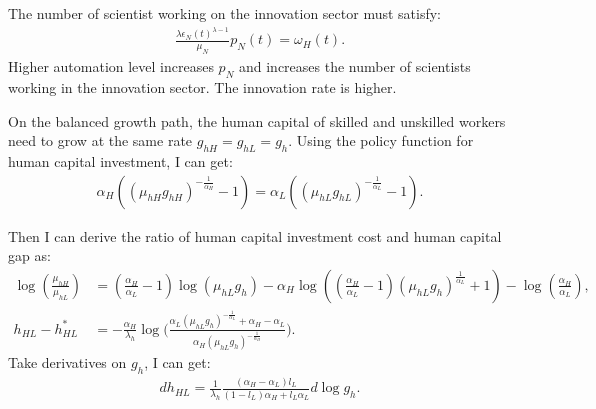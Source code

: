 \documentclass[12pt]{article}
\begin{document}
\begin{appendices}
The number of scientist working on the innovation sector must satisfy: 
\begin{align*}
 \frac{\lambda\epsilon_N(t)^{\lambda-1}}{\mu_N}p_N(t) = \omega_H(t).
\end{align*} 
Higher automation level increases $p_N$ and increases the number of scientists working in the innovation sector. The innovation rate is higher. 

On the balanced growth path, the human capital of skilled and unskilled workers need to grow at the same rate $g_{hH} = g_{hL} = g_h$. Using the policy function for human capital investment, I can get:
\begin{align*}
\alpha_H((\mu_{hH}g_{hH})^{-\frac{1}{\alpha_H}}-1) = \alpha_L((\mu_{hL}g_{hL})^{-\frac{1}{\alpha_L}}-1).
\end{align*}

Then I can derive the ratio of human capital investment cost and human capital gap as:
\begin{align*}
\log(\frac{\mu_{hH}}{\mu_{hL}}) &= (\frac{\alpha_H}{\alpha_L}-1)\log(\mu_{hL}g_h)-\alpha_H\log((\frac{\alpha_H}{\alpha_L}-1)(\mu_{hL}g_h)^{\frac{1}{\alpha_L}}+1)-\log(\frac{\alpha_H}{\alpha_L}), \\
h_{HL}-h_{HL}^*&= -\frac{\alpha_H}{\lambda_h}\log \Big(\frac{\alpha_L(\mu_{hL}g_h)^{-\frac{1}{\alpha_L}}+\alpha_H-\alpha_L}{\alpha_H(\mu_{hL}g_h)^{-\frac{1}{\alpha_H}}}\Big).
\end{align*}
Take derivatives on $g_h$, I can get:
\begin{align*}
dh_{HL} = \frac{1}{\lambda_h}\frac{(\alpha_H-\alpha_L)l_L}{(1-l_L)\alpha_H+l_L\alpha_L}d\log g_h.
\end{align*}


\end{appendices}
\end{document}
